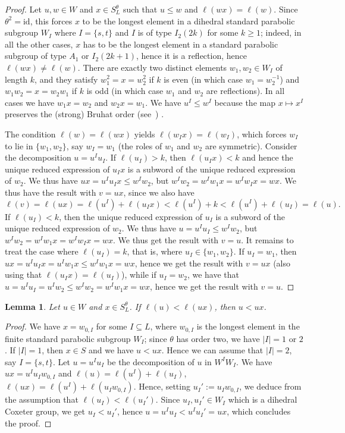 \documentclass[11pt]{article}
\newtheorem{lemma}[theo]{Lemma}
\theoremstyle{definition}
\numberwithin{equation}{section}
\begin{document}
\begin{proof}
	Let $u,w\in W$ and $x\in S_L^\theta$ such that $u\leq w$ and $\ell(wx)=\ell(w)$. Since $\theta^2=\mathrm{id}$, this forces $x$ to be the longest element in a dihedral standard parabolic subgroup $W_I$ where $I=\{s,t\}$ and $I$ is of type $I_2(2k)$ for some $k\geq 1$; indeed, in all the other cases, $x$ has to be the longest element in a standard parabolic subgroup of type $A_1$ or $I_2(2k+1)$, hence it is a reflection, hence $\ell(wx)\neq \ell(w)$. There are exactly two distinct elements $w_1, w_2\in W_I$ of length $k$, and they satisfy $w_1^2=x=w_2^2$ if $k$ is even (in which case $w_1=w_2^{-1}$) and $w_1 w_2=x=w_2 w_1$ if $k$ is odd (in which case $w_1$ and $w_2$ are reflections). In all cases we have $w_1 x=w_2$ and $w_2 x=w_1$. We have $u^I \leq w^I$ because the map $x \mapsto x^I$ preserves the (strong) Bruhat order (see~\cite[Proposition 2.5.1]{BB}) . 
	
	The condition $\ell(w)=\ell(wx)$ yields $\ell(w_I x)=\ell(w_I)$, which forces $w_I$ to lie in $\{w_1, w_2\}$, say $w_I=w_1$ (the roles of $w_1$ and $w_2$ are symmetric). Consider the decomposition $u=u^I u_I$. If $\ell(u_I)>k$, then $\ell(u_I x) < k$ and hence  the unique reduced expression of $u_I x$ is a subword of the unique reduced expression of $w_2$. We thus have $ux = u^I u_Ix \leq w^I w_2$, but $w^I w_2= w^I w_1x=w^I w_I x=wx$. We thus have the result with $v=ux$, since we also have $$\ell(v)=\ell(ux)= \ell(u^I)+\ell(u_I x)< \ell(u^I)+k<\ell(u^I)+\ell(u_I)=\ell(u).$$  
If $\ell(u_I)<k$, then the unique reduced expression of $u_I$ is a subword of the unique reduced expression of $w_2$. We thus have $u=u^I u_I \leq w^I w_2$, but $w^I w_2= w^I w_1 x=w^I w_I x=wx$. We thus get the result with $v=u$. It remains to treat the case where $\ell(u_I)=k$, that is, where $u_I\in \{w_1, w_2\}$. If $u_I=w_1$, then $ux= u^I u_I x= u^I w_1 x \leq w^I w_1 x =wx$, hence we get the result with $v=ux$ (also using that $\ell(u_Ix)=\ell(u_I)$), while if $u_I=w_2$, we have that $u=u^I u_I=u^I w_2 \leq w^I w_2=w^I w_1x=wx$, hence we get the result with $v=u$.
\end{proof}

\begin{lemma}\label{lem_long_gen}
	Let $u\in W$ and $x\in S_L^\theta$. If $\ell(u)< \ell(ux)$, then $u<ux$.
\end{lemma}

\begin{proof}
	We have $x=w_{0,I}$ for some $I\subseteq L$, where $w_{0,I}$ is the longest element in the finite standard parabolic subgroup $W_I$; since $\theta$ has order two, we have $|I|=1$ or $2$. If $|I|=1$, then $x\in S$ and we have $u < ux$. Hence we can assume that $|I|=2$, say $I=\{s,t\}$. Let $u=u^I u_I$ be the decomposition of $u$ in $W^I W_I$. We have $ux=u^I u_I w_{0,I}$ and $\ell(u)=\ell(u^I)+\ell(u_I)$, $\ell(ux)=\ell(u^I)+\ell(u_I w_{0,I})$. Hence, setting $u_I':=u_I w_{0,I}$, we deduce from the assumption that $\ell(u_I)<\ell(u_I')$. Since $u_I, u_I'\in W_I$ which is a dihedral Coxeter group, we get $u_I < u_I'$, hence $u=u^I u_I < u^I u_I'=ux$, which concludes the proof.
\end{proof}
\end{document}
